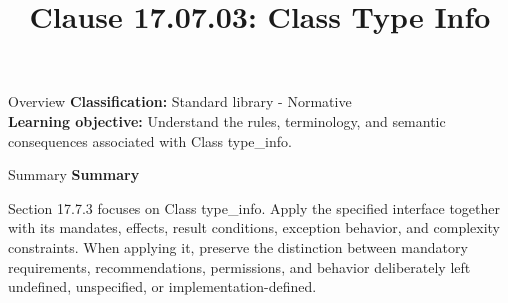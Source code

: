 \documentclass[10pt,letterpaper]{article}
\title{Clause 17.07.03: Class Type Info}
\author{}
\date{}
\begin{document}
\maketitle
\begin{CornellOverviewBox}{Overview}
\textbf{Classification:} Standard library - Normative\\[2pt]
\textbf{Learning objective:} Understand the rules, terminology, and semantic consequences associated with Class type\_info.
\end{CornellOverviewBox}\begin{CornellSummaryBox}{Summary}
{\sffamily\bfseries\color{Accent} Summary}\par\vspace{3pt}Section 17.7.3 focuses on Class type\_info. Apply the specified interface together with its mandates, effects, result conditions, exception behavior, and complexity constraints. When applying it, preserve the distinction between mandatory requirements, recommendations, permissions, and behavior deliberately left undefined, unspecified, or implementation-defined.
\end{CornellSummaryBox}
\end{document}
